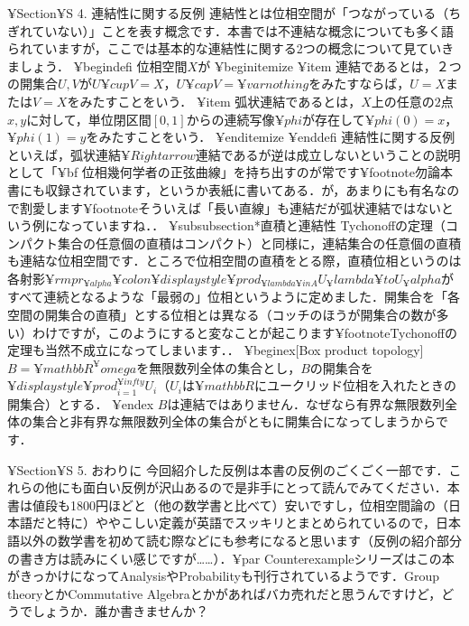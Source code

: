 ¥Section{¥S 4. 連結性に関する反例}
連結性とは位相空間が「つながっている（ちぎれていない）」ことを表す概念です．本書では不連結な概念についても多く語られていますが，ここでは基本的な連結性に関する2つの概念について見ていきましょう．
¥begin{defi}
位相空間$X$が
¥begin{itemize}
¥item 連結であるとは，２つの開集合$U,V$が$U¥cup V=X$，$U¥cap V=¥varnothing$をみたすならば，$U=X$または$V=X$をみたすことをいう．
¥item 弧状連結であるとは，$X$上の任意の$2$点$x,y$に対して，単位閉区間$[0,1]$からの連続写像$¥phi$が存在して$¥phi (0)=x$，$¥phi (1)=y$をみたすことをいう．
¥end{itemize}
¥end{defi}
連結性に関する反例といえば，弧状連結$¥Rightarrow$連結であるが逆は成立しないということの説明として「{¥bf 位相幾何学者の正弦曲線}」を持ち出すのが常です¥footnote{勿論本書にも収録されています，というか表紙に書いてある．}が，あまりにも有名なので割愛します¥footnote{そういえば「長い直線」も連結だが弧状連結ではないという例になっていますね．}．
¥subsubsection*{直積と連結性}
Tychonoffの定理（コンパクト集合の任意個の直積はコンパクト）と同様に，連結集合の任意個の直積も連結な位相空間です．ところで位相空間の直積をとる際，直積位相というのは各射影$¥rm{pr_{¥alpha}}¥colon¥displaystyle ¥prod_{¥lambda¥in A} U_¥lambda¥to U_¥alpha$がすべて連続となるような「最弱の」位相というように定めました．開集合を「各空間の開集合の直積」とする位相とは異なる（コッチのほうが開集合の数が多い）わけですが，このようにすると変なことが起こります¥footnote{Tychonoffの定理も当然不成立になってしまいます．}．
¥begin{ex}[Box product topology]
$B=¥mathbb{R}^¥omega$を無限数列全体の集合とし，$B$の開集合を$¥displaystyle ¥prod_{i=1}^{¥infty} U_i$（$U_i$は$¥mathbb{R}$にユークリッド位相を入れたときの開集合）とする．
¥end{ex}
$B$は連結ではありません．なぜなら有界な無限数列全体の集合と非有界な無限数列全体の集合がともに開集合になってしまうからです．

¥Section{¥S 5. おわりに}
今回紹介した反例は本書の反例のごくごく一部です．これらの他にも面白い反例が沢山あるので是非手にとって読んでみてください．本書は値段も1800円ほどと（他の数学書と比べて）安いですし，位相空間論の（日本語だと特に）ややこしい定義が英語でスッキリとまとめられているので，日本語以外の数学書を初めて読む際などにも参考になると思います（反例の紹介部分の書き方は読みにくい感じですが……）．¥par
Counterexampleシリーズはこの本がきっかけになってAnalysisやProbabilityも刊行されているようです．Group theoryとかCommutative Algebraとかがあればバカ売れだと思うんですけど，どうでしょうか．誰か書きませんか？
